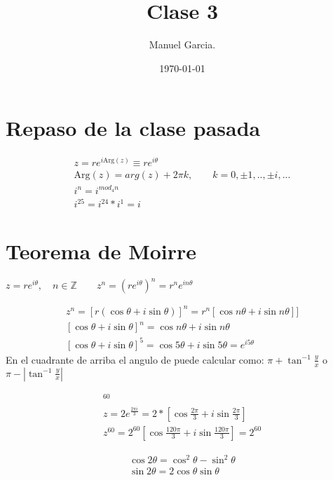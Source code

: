 \documentclass{article}
\title{Clase 3 }
\author{Manuel Garcia.}
\date{\today}
\newcommand{\caja}[3]{%
  \begin{tcolorbox}[colback=#1!5!white,colframe=#1!25!black,title=#2]
    #3
  \end{tcolorbox}%
}
\begin{document}
\maketitle

\section{Repaso de la clase pasada}
\caja{green}{Representacion polar }{
  \begin{gather}
    z = r e ^ {i \text{Arg}(z ) } \equiv re ^ {i\theta}\\
    \text{Arg}(z) = arg(z) +2\pi k,\qquad k = 0,\pm 1,.., \pm i,... \\
    i ^ {n } = i ^ {mod_4n}\\
    i ^ {25 } = i ^ {24 }*i^1 = i
    \label{eq:null}
  \end{gather}
}

\section{Teorema de Moirre }
$ z = r e ^ {i\theta } , \quad n \in \mathbb{Z} \qquad z ^ {n }=(re ^ {i\theta }) ^ {n } = r ^ {n }e ^ {in \theta } $

\begin{gather}
   z ^ {n } = [r(\cos{\theta} +i \sin{\theta} )] ^ {n } = r^n [\cos{n \theta} +i \sin{n \theta} ]  ] \\
   [\cos{\theta} +i \sin{\theta} ]^n = \cos{n \theta} +i \sin{n \theta} \\
   [\cos{\theta}  + i \sin{\theta}  ]^5 = \cos{5 \theta} +i \sin{5 \theta}  = e ^ {i5\theta }  
\end{gather}
En el cuadrante de arriba el angulo de puede calcular como: $ \pi + \tan^{-1}{\frac{y}{x} } $ o $ \pi - |\tan^{-1}{\frac{y}{x} } |$
\caja{black}{Ejercicio}{
  \begin{gather}
    [-1+i \sqrt{3 }  ] ^ {60}\\
    z = 2e ^ {\frac{2\pi i }{3 } } = 2* [\cos{\frac{2\pi}{3}+i \sin{\frac{2\pi}{3} }   }  ]\\
    z ^ {60 } = 2 ^ {60 }[\cos{\frac{120\pi}{3} } + i \sin{\frac{120\pi}{3 } }   ] = 2 ^ {60}
  \end{gather}
}
\caja{black}{Identidad}{
  \begin{gather}
    \cos{2 \theta}  = \cos ^ {2 }{\theta }  - \sin^2{\theta}\\
    \sin{2 \theta} = 2 \cos{\theta} \sin{\theta}    
    \label{eq:identidad_trigonometrica }
  \end{gather}
}
\end{document}
